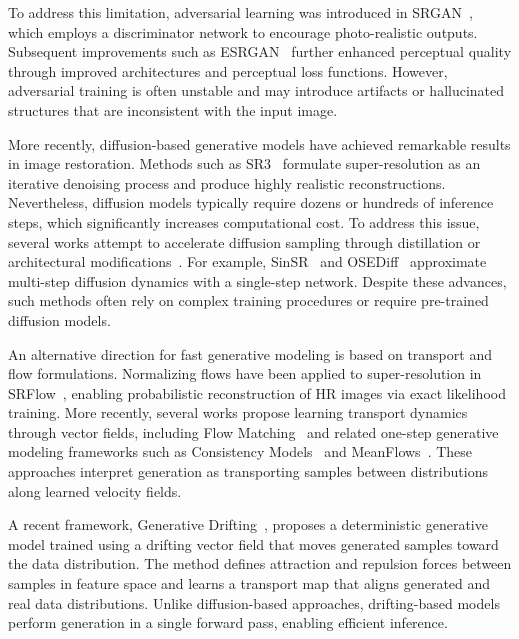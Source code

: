 \documentclass{article}
\begin{document}
To address this limitation, adversarial learning was introduced in SRGAN~\cite{ledig2017srgan}, which employs a discriminator network to encourage photo-realistic outputs. 
Subsequent improvements such as ESRGAN~\cite{wang2018esrgan} further enhanced perceptual quality through improved architectures and perceptual loss functions. 
However, adversarial training is often unstable and may introduce artifacts or hallucinated structures that are inconsistent with the input image.

More recently, diffusion-based generative models have achieved remarkable results in image restoration. 
Methods such as SR3~\cite{saharia2021sr3} formulate super-resolution as an iterative denoising process and produce highly realistic reconstructions. 
Nevertheless, diffusion models typically require dozens or hundreds of inference steps, which significantly increases computational cost. 
To address this issue, several works attempt to accelerate diffusion sampling through distillation or architectural modifications~\cite{salimans2022progressive}. 
For example, SinSR~\cite{wang2023sinsr} and OSEDiff~\cite{wu2024osediff} approximate multi-step diffusion dynamics with a single-step network. 
Despite these advances, such methods often rely on complex training procedures or require pre-trained diffusion models.

An alternative direction for fast generative modeling is based on transport and flow formulations. 
Normalizing flows have been applied to super-resolution in SRFlow~\cite{lugmayr2020srflow}, enabling probabilistic reconstruction of HR images via exact likelihood training. 
More recently, several works propose learning transport dynamics through vector fields, including Flow Matching~\cite{lipman2023flowmatching} and related one-step generative modeling frameworks such as Consistency Models~\cite{song2023consistency} and MeanFlows~\cite{geng2025meanflows}. 
These approaches interpret generation as transporting samples between distributions along learned velocity fields.

A recent framework, Generative Drifting~\cite{deng2026drifting}, proposes a deterministic generative model trained using a drifting vector field that moves generated samples toward the data distribution. 
The method defines attraction and repulsion forces between samples in feature space and learns a transport map that aligns generated and real data distributions. 
Unlike diffusion-based approaches, drifting-based models perform generation in a single forward pass, enabling efficient inference.
\end{document}
